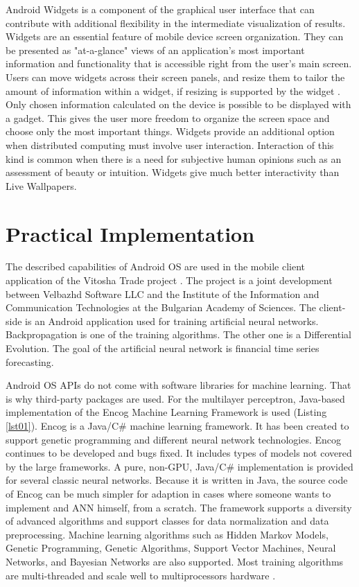 \documentclass[a4paper,conference]{IEEEtran}
\begin{document}
Android Widgets is a component of the graphical user interface that can contribute with additional flexibility in the intermediate visualization of results. Widgets are an essential feature of mobile device screen organization. They can be presented as "at-a-glance" views of an application's most important information and functionality that is accessible right from the user's main screen. Users can move widgets across their screen panels, and resize them to tailor the amount of information within a widget, if resizing is supported by the widget \cite{Google-02}. Only chosen information calculated on the device is possible to be displayed with a gadget. This gives the user more freedom to organize the screen space and choose only the most important things. Widgets provide an additional option when distributed computing must involve user interaction. Interaction of this kind is common when there is a need for subjective human opinions such as an assessment of beauty or intuition. Widgets give much better interactivity than Live Wallpapers. 

\section{Practical Implementation}

The described capabilities of Android OS are used in the mobile client application of the Vitosha Trade project \cite{Balabanov-01}. The project is a joint development between Velbazhd Software LLC and the Institute of the Information and Communication Technologies at the Bulgarian Academy of Sciences. The client-side is an Android application used for training artificial neural networks. Backpropagation is one of the training algorithms. The other one is a Differential Evolution. The goal of the artificial neural network is financial time series forecasting. 

Android OS APIs do not come with software libraries for machine learning. That is why third-party packages are used. For the multilayer perceptron, Java-based implementation of the Encog Machine Learning Framework is used (Listing \ref{lst01}). Encog is a Java/C\# machine learning framework. It has been created to support genetic programming and different neural network technologies. Encog continues to be developed and bugs fixed. It includes types of models not covered by the large frameworks. A pure, non-GPU, Java/C\# implementation is provided for several classic neural networks. Because it is written in Java, the source code of Encog can be much simpler for adaption in cases where someone wants to implement and ANN himself, from a scratch. The framework supports a diversity of advanced algorithms and support classes for data normalization and data preprocessing. Machine learning algorithms such as Hidden Markov Models, Genetic Programming, Genetic Algorithms, Support Vector Machines, Neural Networks, and Bayesian Networks are also supported. Most training algorithms are multi-threaded and scale well to multiprocessors hardware \cite{Heaton-01}.
\end{document}
